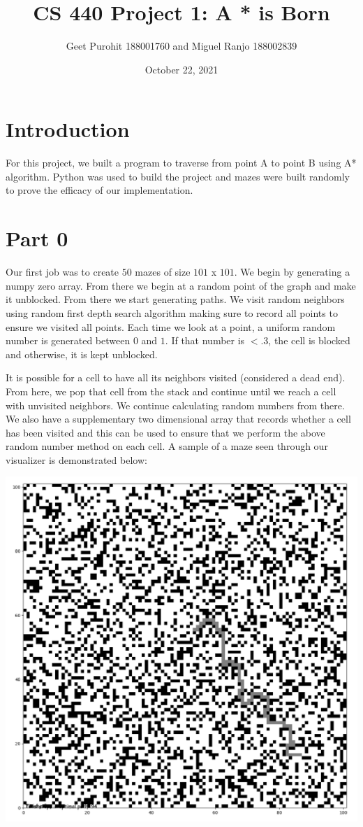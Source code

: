 \documentclass{article}
\title{CS 440 Project 1: A * is Born}
\author{Geet Purohit 188001760 and Miguel Ranjo 188002839}
\affil{Fast Trajectory Replanning}
\date{October 22, 2021}
\begin{document}
\maketitle

\section*{Introduction}

For this project, we built a program to traverse from point A to point B using A* algorithm. Python was used to build the project and mazes were built randomly to prove the efficacy of our implementation.

\section*{Part 0}

Our first job was to create $50$ mazes of size $101$ x $101$.  We begin by generating a numpy zero array. From there we begin at a random point of the graph and make it unblocked. From there we start generating paths. We visit random neighbors using random first depth search algorithm making sure to record all points to ensure we visited all points. Each time we look at a point, a uniform random number is generated between $0$ and $1$. If that number is $<.3$, the cell is blocked and otherwise, it is kept unblocked.

It is possible for a cell to have all its neighbors visited (considered a dead end). From here, we pop that cell from the stack and continue until we reach a cell with unvisited neighbors. We continue calculating random numbers from there. We also have a supplementary two dimensional array that records whether a cell has been visited and this can be used to ensure that we perform the above random number method on each cell.
\newpage
A sample of a maze seen through our visualizer is demonstrated below:


\includegraphics[scale=.3]{Figure_1.png}
\end{document}
